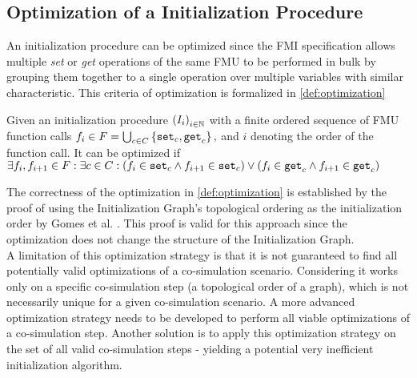 \subsection{Optimization of a Initialization Procedure}
An initialization procedure can be optimized since the FMI specification allows multiple \textit{set} or \textit{get} operations of the same FMU to be performed in bulk by grouping them together to a single operation over multiple variables with similar characteristic. This criteria of optimization is formalized in \cref{def:optimization}
\begin{definition}\label{def:optimization}
  Given an initialization procedure $ \left( I_i \right)_{i \in \mathbb{N}}$ with a finite ordered sequence of FMU function calls $f_i \in F = \bigcup_{c \in C}  \left\{ \mathtt{set}_{c},\mathtt{get}_{c} \right\},$ and $i$ denoting the order of the function call. It can be optimized if $\exists f_i, f_{i +1} \in F : \exists c \in C :(f_i \in {\mathtt{set}_{c}} \land f_{i+1} \in {\mathtt{set}_{c}}) \lor (f_i \in {\mathtt{get}_{c}} \land f_{i+1} \in {\mathtt{get}_{c}})$
\end{definition}
The correctness of the optimization in \cref{def:optimization} is established by the proof of using the Initialization Graph's topological ordering as the initialization order by Gomes et al. \cite{Gomes2019}. This proof is valid for this approach since the optimization does not change the structure of the Initialization Graph. \\
A limitation of this optimization strategy is that it is not guaranteed to find all potentially valid optimizations of a co-simulation scenario. Considering it works only on a specific co-simulation step (a topological order of a graph), which is not necessarily unique for a given co-simulation scenario. A more advanced optimization strategy needs to be developed to perform all viable optimizations of a co-simulation step. Another solution is to apply this optimization strategy on the set of all valid co-simulation steps - yielding a potential very inefficient initialization algorithm.

